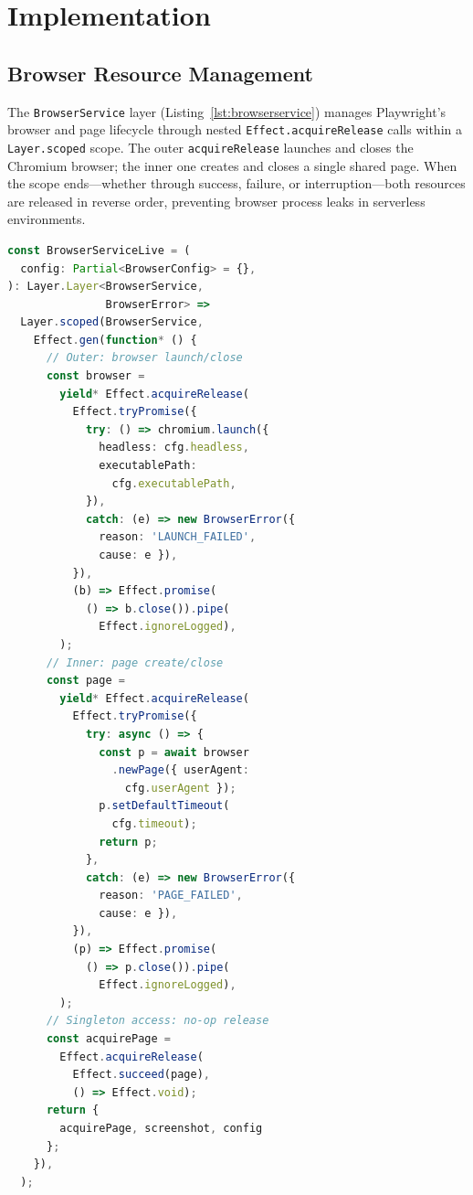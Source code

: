 \documentclass[conference]{IEEEtran}
\begin{document}
\section{Implementation}

\subsection{Browser Resource Management}

The \texttt{BrowserService} layer (Listing~\ref{lst:browserservice}) manages Playwright's browser and page lifecycle through nested \texttt{Effect.acquireRelease} calls within a \texttt{Layer.scoped} scope. The outer \texttt{acquireRelease} launches and closes the Chromium browser; the inner one creates and closes a single shared page. When the scope ends---whether through success, failure, or interruption---both resources are released in reverse order, preventing browser process leaks in serverless environments.

\begin{lstlisting}[language=TypeScript,caption={Nested \texttt{acquireRelease} for browser lifecycle management},label={lst:browserservice}]
const BrowserServiceLive = (
  config: Partial<BrowserConfig> = {},
): Layer.Layer<BrowserService,
               BrowserError> =>
  Layer.scoped(BrowserService,
    Effect.gen(function* () {
      // Outer: browser launch/close
      const browser =
        yield* Effect.acquireRelease(
          Effect.tryPromise({
            try: () => chromium.launch({
              headless: cfg.headless,
              executablePath:
                cfg.executablePath,
            }),
            catch: (e) => new BrowserError({
              reason: 'LAUNCH_FAILED',
              cause: e }),
          }),
          (b) => Effect.promise(
            () => b.close()).pipe(
              Effect.ignoreLogged),
        );
      // Inner: page create/close
      const page =
        yield* Effect.acquireRelease(
          Effect.tryPromise({
            try: async () => {
              const p = await browser
                .newPage({ userAgent:
                  cfg.userAgent });
              p.setDefaultTimeout(
                cfg.timeout);
              return p;
            },
            catch: (e) => new BrowserError({
              reason: 'PAGE_FAILED',
              cause: e }),
          }),
          (p) => Effect.promise(
            () => p.close()).pipe(
              Effect.ignoreLogged),
        );
      // Singleton access: no-op release
      const acquirePage =
        Effect.acquireRelease(
          Effect.succeed(page),
          () => Effect.void);
      return {
        acquirePage, screenshot, config
      };
    }),
  );
\end{lstlisting}
\end{document}
